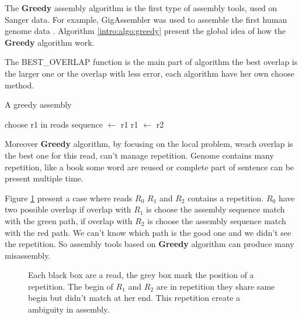 \documentclass[./main.tex]{subfiles}
\begin{document}
The \textbf{Greedy} assembly algorithm is the first type of assembly tools, used on Sanger data. For example, GigAssembler was used to assemble the first human genome data \cite{GigAssembler}. Algorithm \ref{intro:algo:greedy} present the global idea of how the \textbf{Greedy} algorithm work.

The BEST\_OVERLAP function is the main part of algorithm the best overlap is the larger one or the overlap with less error, each algorithm have her own choose method.

\begin{algorithm}[ht]
    \caption{A greedy assembly}
    \begin{algorithmic}[1]
        \State choose r1 in reads
        \State sequence $\leftarrow$ r1
            \State {}
            \State {}
            \State r1 $\leftarrow$ r2
        \EndWhile
    \EndFunction
    \end{algorithmic}
    \label{intro:algo:greedy}
\end{algorithm}

Moreover \textbf{Greedy} algorithm, by focusing on the local problem, weach overlap is the best one for this read, can't manage repetition. Genome contains many repetition, like a book some word are reused or complete part of sentence can be present multiple time.

Figure \ref{intro:fig:greedy:repetition} present a case where reads $R_0$ $R_1$ and $R_2$ contains a repetition. $R_0$ have two possible overlap if overlap with $R_1$ is choose the assembly sequence match with the green path, if overlap with $R_2$ is choose the assembly sequence match with the red path. We can't know which path is the good one and we didn't see the repetition. So assembly tools based on \textbf{Greedy} algorithm can produce many misassembly. 

\begin{figure}[ht]
    \centering 
    
    \caption{Each black box are a read, the grey box mark the position of a repetition. The begin of $R_1$ and $R_2$ are in repetition they share same begin but didn't match at her end. This repetition create a ambiguity in assembly.}
    \label{intro:fig:greedy:repetition}
\end{figure}
\end{document}
